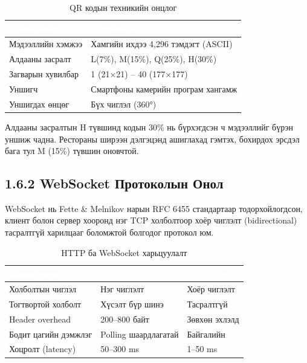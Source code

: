 \begin{table}[htbp]
\caption{QR кодын техникийн онцлог}
\label{tab:qrspec}
\centering
\begin{tabularx}{0.85\textwidth}{|X|X|}
\hline
\rowcolor{TableHeader}\textcolor{white}{\textbf{Шинж чанар}} & \textcolor{white}{\textbf{Тодорхойлолт}} \\ \hline
Мэдээллийн хэмжээ    & Хамгийн ихдээ 4,296 тэмдэгт (ASCII) \\ \hline
Алдааны засралт      & L(7\%), M(15\%), Q(25\%), H(30\%) \\ \hline
Загварын хувилбар    & 1 (21$\times$21) -- 40 (177$\times$177) \\ \hline
Уншигч               & Смартфоны камерийн програм хангамж \\ \hline
Уншигдах өнцөг       & Бүх чиглэл (360°) \\ \hline
\end{tabularx}
\end{table}

Алдааны засралтын H түвшинд кодын 30\% нь бүрхэгдсэн ч мэдээллийг бүрэн уншиж
чадна. Рестораны ширээн дэлгэцэнд ашиглахад гэмтэх, бохирдох эрсдэл бага тул
M (15\%) түвшин оновчтой.

\subsection{1.6.2 WebSocket Протоколын Онол}

WebSocket нь Fette \& Melnikov \cite{rfc6455} нарын RFC 6455 стандартаар
тодорхойлогдсон, клиент болон сервер хооронд нэг TCP холболтоор хоёр чиглэлт
(bidirectional) тасралтгүй харилцааг боломжтой болгодог протокол юм.

\begin{table}[htbp]
\caption{HTTP ба WebSocket харьцуулалт}
\label{tab:wscompare}
\centering
\begin{tabularx}{\textwidth}{|X|Z|Z|}
\hline
{}\textcolor{white}{\textbf{Шинж чанар}}
  & \textcolor{white}{\textbf{HTTP}}
  & \textcolor{white}{\textbf{WebSocket}} \\ \hline
Холболтын чиглэл      & Нэг чиглэлт    & Хоёр чиглэлт \\ \hline
Тогтвортой холболт    & Хүсэлт бүр шинэ & Тасралтгүй \\ \hline
Header overhead       & 200--800 байт  & Зөвхөн эхлэлд \\ \hline
Бодит цагийн дэмжлэг & Polling шаардлагатай & Байгалийн \\ \hline
Хоцролт (latency)     & 50--300 ms     & 1--50 ms \\ \hline
\end{tabularx}
\end{table}

